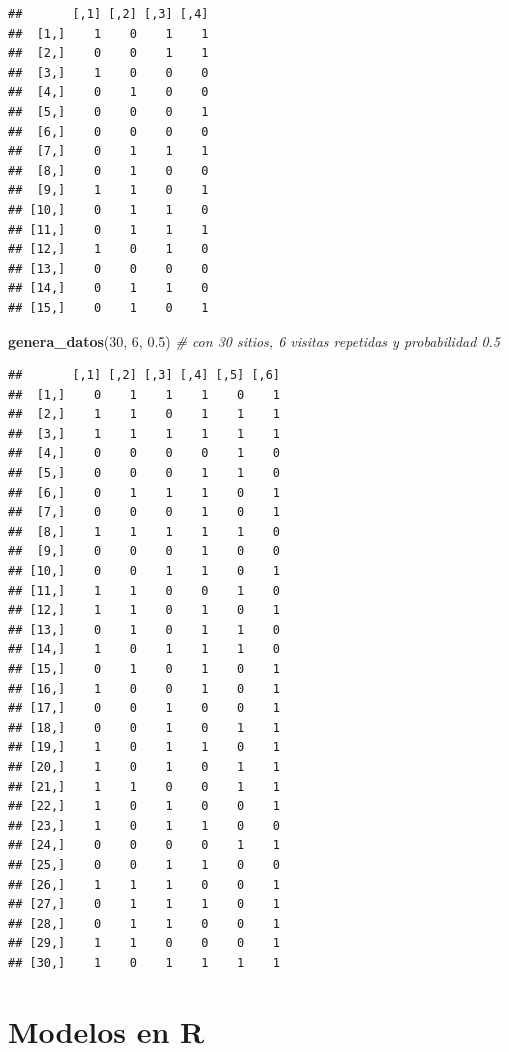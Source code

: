 \documentclass[
]{book}
\newenvironment{Shaded}{\begin{snugshade}}{\end{snugshade}}
\newcommand{\CommentTok}[1]{\textcolor[rgb]{0.56,0.35,0.01}{\textit{#1}}}
\newcommand{\DecValTok}[1]{\textcolor[rgb]{0.00,0.00,0.81}{#1}}
\newcommand{\FloatTok}[1]{\textcolor[rgb]{0.00,0.00,0.81}{#1}}
\newcommand{\KeywordTok}[1]{\textcolor[rgb]{0.13,0.29,0.53}{\textbf{#1}}}
\newcommand{\NormalTok}[1]{#1}
\begin{document}
\begin{verbatim}
##       [,1] [,2] [,3] [,4]
##  [1,]    1    0    1    1
##  [2,]    0    0    1    1
##  [3,]    1    0    0    0
##  [4,]    0    1    0    0
##  [5,]    0    0    0    1
##  [6,]    0    0    0    0
##  [7,]    0    1    1    1
##  [8,]    0    1    0    0
##  [9,]    1    1    0    1
## [10,]    0    1    1    0
## [11,]    0    1    1    1
## [12,]    1    0    1    0
## [13,]    0    0    0    0
## [14,]    0    1    1    0
## [15,]    0    1    0    1
\end{verbatim}

\begin{Shaded}
\begin{Highlighting}[]
\KeywordTok{genera_datos}\NormalTok{(}\DecValTok{30}\NormalTok{, }\DecValTok{6}\NormalTok{, }\FloatTok{0.5}\NormalTok{) }\CommentTok{# con 30 sitios, 6 visitas repetidas y probabilidad 0.5}
\end{Highlighting}
\end{Shaded}

\begin{verbatim}
##       [,1] [,2] [,3] [,4] [,5] [,6]
##  [1,]    0    1    1    1    0    1
##  [2,]    1    1    0    1    1    1
##  [3,]    1    1    1    1    1    1
##  [4,]    0    0    0    0    1    0
##  [5,]    0    0    0    1    1    0
##  [6,]    0    1    1    1    0    1
##  [7,]    0    0    0    1    0    1
##  [8,]    1    1    1    1    1    0
##  [9,]    0    0    0    1    0    0
## [10,]    0    0    1    1    0    1
## [11,]    1    1    0    0    1    0
## [12,]    1    1    0    1    0    1
## [13,]    0    1    0    1    1    0
## [14,]    1    0    1    1    1    0
## [15,]    0    1    0    1    0    1
## [16,]    1    0    0    1    0    1
## [17,]    0    0    1    0    0    1
## [18,]    0    0    1    0    1    1
## [19,]    1    0    1    1    0    1
## [20,]    1    0    1    0    1    1
## [21,]    1    1    0    0    1    1
## [22,]    1    0    1    0    0    1
## [23,]    1    0    1    1    0    0
## [24,]    0    0    0    0    1    1
## [25,]    0    0    1    1    0    0
## [26,]    1    1    1    0    0    1
## [27,]    0    1    1    1    0    1
## [28,]    0    1    1    0    0    1
## [29,]    1    1    0    0    0    1
## [30,]    1    0    1    1    1    1
\end{verbatim}

\hypertarget{modelos-en-r}{%
\chapter{Modelos en R}\label{modelos-en-r}}
\end{document}
